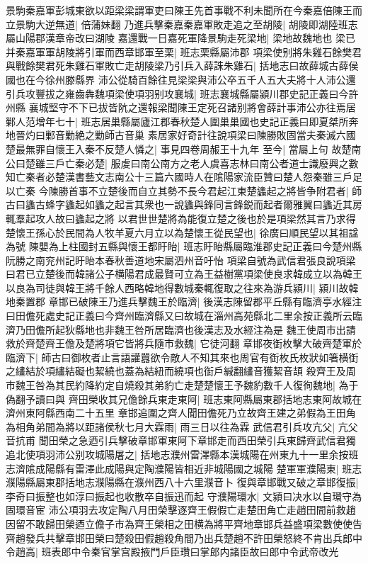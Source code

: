 景駒秦嘉軍彭城東欲以距梁梁謂軍吏曰陳王先首事戰不利未聞所在今秦嘉倍陳王而立景駒大逆無道|{
	倍蒲妹翻}
乃進兵擊秦嘉秦嘉軍敗走追之至胡陵|{
	胡陵即湖陸班志屬山陽郡漢章帝改曰湖陵}
嘉還戰一日嘉死軍降景駒走死梁地|{
	梁地故魏地也}
梁已并秦嘉軍軍胡陵將引軍而西章邯軍至栗|{
	班志栗縣屬沛郡}
項梁使别將朱雞石餘樊君與戰餘樊君死朱雞石軍敗亡走胡陵梁乃引兵入薛誅朱雞石|{
	括地志曰故薛城古薛侯國也在今徐州滕縣界}
沛公從騎百餘往見梁梁與沛公卒五千人五大夫將十人沛公還引兵攻豐拔之雍齒犇魏項梁使項羽别攻襄城|{
	班志襄城縣屬潁川郡史記正義曰今許州縣}
襄城堅守不下已拔皆阬之還報梁聞陳王定死召諸别將會薛計事沛公亦往焉居鄛人范增年七十|{
	班志居巢縣屬廬江郡春秋楚人圍巢巢國也史記正義曰即夏桀所奔地晉灼曰鄛音勦絶之勦師古音巢}
素居家好奇計往說項梁曰陳勝敗固當夫秦滅六國楚最無罪自懷王入秦不反楚人憐之|{
	事見四卷周赧王十九年}
至今|{
	當屬上句}
故楚南公曰楚雖三戶亡秦必楚|{
	服䖍曰南公南方之老人虞喜志林曰南公者道士識廢興之數知亡秦者必楚漢書藝文志南公十三篇六國時人在隂陽家流臣贊曰楚人怨秦雖三戶足以亡秦}
今陳勝首事不立楚後而自立其勢不長今君起江東楚蠭起之將皆争附君者|{
	師古曰蠭古蜂字蠭起如蠭之起言其衆也一說蠭與鋒同言鋒鋭而起者爾雅翼曰蠭近其房輒羣起攻人故曰蠭起之將}
以君世世楚將為能復立楚之後也於是項梁然其言乃求得楚懷王孫心於民間為人牧羊夏六月立以為楚懷王從民望也|{
	徐廣曰順民望以其祖諡為號}
陳嬰為上柱國封五縣與懷王都盱眙|{
	班志盱眙縣屬臨淮郡史記正義曰今楚州縣阮勝之南兖州記盱眙本春秋善道地宋屬泗州音吁怡}
項梁自號為武信君張良說項梁曰君已立楚後而韓諸公子横陽君成最賢可立為王益樹黨項梁使良求韓成立以為韓王以良為司徒與韓王將千餘人西略韓地得數城秦輒復取之往來為游兵潁川|{
	潁川故韓地秦置郡}
章邯已破陳王乃進兵擊魏王於臨濟|{
	後漢志陳留郡平丘縣有臨濟亭水經注曰田儋死處史記正義曰今齊州臨濟縣又曰故城在淄州高苑縣北二里余按正義所云臨濟乃田儋所起狄縣地也非魏王咎所居臨濟也後漢志及水經注為是}
魏王使周市出請救於齊楚齊王儋及楚將項它皆將兵隨市救魏|{
	它徒河翻}
章邯夜衘枚擊大破齊楚軍於臨濟下|{
	師古曰御枚者止言語讙囂欲令敵人不知其來也周官有衘枚氏枚狀如箸横衘之繣結於項繣結礙也絜繞也蓋為結紐而繞項也衘戶緘翻繣音獲絜音頡}
殺齊王及周市魏王咎為其民約降約定自燒殺其弟豹亡走楚楚懷王予魏豹數千人復徇魏地|{
	為于偽翻予讀曰與}
齊田榮收其兄儋餘兵東走東阿|{
	班志東阿縣屬東郡括地志東阿故城在濟州東阿縣西南二十五里}
章邯追圍之齊人聞田儋死乃立故齊王建之弟假為王田角為相角弟間為將以距諸侯秋七月大霖雨|{
	雨三日以往為霖}
武信君引兵攻亢父|{
	亢父音抗甫}
聞田榮之急迺引兵擊破章邯軍東阿下章邯走而西田榮引兵東歸齊武信君獨追北使項羽沛公别攻城陽屠之|{
	括地志濮州雷澤縣本漢城陽在州東九十一里余按班志濟隂成陽縣有雷澤此成陽與定陶濮陽皆相近非城陽國之城陽}
楚軍軍濮陽東|{
	班志濮陽縣屬東郡括地志濮陽縣在濮州西八十六里濮音卜}
復與章邯戰又破之章邯復振|{
	李奇曰振整也如淳曰振起也收散卒自振迅而起}
守濮陽環水|{
	文潁曰决水以自環守為固環音宦}
沛公項羽去攻定陶八月田榮擊逐齊王假假亡走楚田角亡走趙田間前救趙因留不敢歸田榮迺立儋子市為齊王榮相之田横為將平齊地章邯兵益盛項梁數使使告齊趙發兵共擊章邯田榮曰楚殺田假趙殺角間乃出兵楚趙不許田榮怒終不肯出兵郎中令趙高|{
	班表郎中令秦官掌宫殿掖門戶臣瓚曰掌郎内諸臣故曰郎中令武帝改光}


